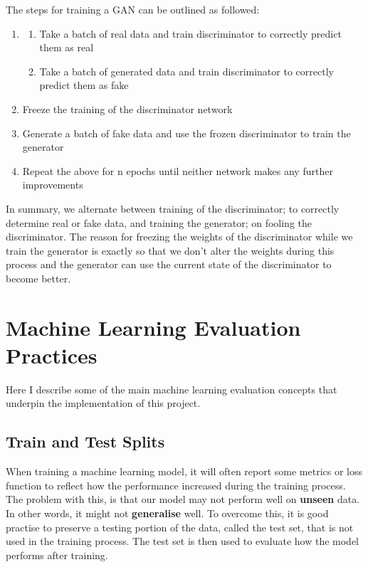 \documentclass[12pt,a4paper,twoside]{report}
\begin{document}
The steps for training a GAN can be outlined as followed:
\begin{enumerate}[Step 1:]
  \item 
  \begin{enumerate}
  \item Take a batch of real data and train discriminator to correctly predict them as real
  \item Take a batch of generated data and train discriminator to correctly predict them as fake
\end{enumerate}
  
  \item Freeze the training of the discriminator network
  \item Generate a batch of fake data and use the frozen discriminator to train the generator
  \item Repeat the above for n epochs until neither network makes any further improvements
\end{enumerate}

In summary, we alternate between training of the discriminator; to correctly determine real or fake data, and training the generator; on fooling the discriminator. The reason for freezing the weights of the discriminator while we train the generator is exactly so that we don't alter the weights during this process and the generator can use the current state of the discriminator to become better.

\section{Machine Learning Evaluation Practices}
Here I describe some of the main machine learning evaluation concepts that underpin the implementation of this project. 

\subsection{Train and Test Splits}

When training a machine learning model, it will often report some metrics or loss function to reflect how the performance increased during the training process. The problem with this, is that our model may not perform well on \textbf{unseen} data. In other words, it might not \textbf{generalise} well. To overcome this, it is good practise to preserve a testing portion of the data, called the test set, that is not used in the training process. The test set is then used to evaluate how the model performs after training. 
\end{document}
